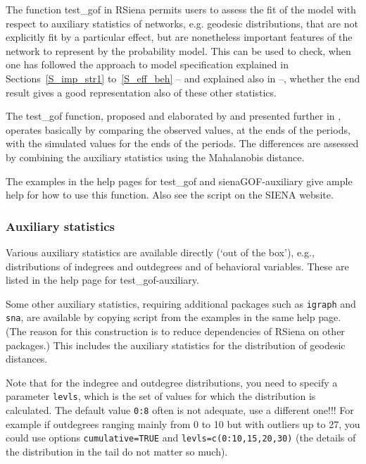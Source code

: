 \documentclass[a4paper,fleqn,11pt]{article}
\newcommand{\+}{\, + \,}
\newcommand{\sfn}[1]{\textsf{#1}}
\newcommand{\RS}{{\sf \textsf{RSiena} }}
\newcommand{\SI}{{\sf SIENA }}
\begin{document}
The function  \sfn{test\_gof} in \RS permits users
to assess the fit of the model with respect to
auxiliary statistics of networks, e.g. geodesic distributions,
that are not explicitly fit by a particular effect,
but are nonetheless important features of the network to represent by the
probability model.
This can be used to check, when one has followed the approach to
model specification explained in Sections~\ref{S_imp_str1}
to~\ref{S_eff_beh} -- and explained also in \citet{SnijdersEA10b} --,
whether the end result gives a good representation
also of these other statistics.

The \textsf{test\_gof} function, proposed and elaborated by
\citet{Lospinoso2012} and presented further
in \citet{LospinosoSnijders2019}, operates basically by comparing
the observed values, at the ends of the periods, with the
simulated values for the ends of the periods.
The differences are assessed by combining the auxiliary statistics
using the Mahalanobis distance.

The examples in the help pages for \textsf{test\_gof} and \sfn{sienaGOF-auxiliary}
give ample help for how to use this function.
Also see the script on the \SI website.


\subsubsection{Auxiliary statistics}

Various auxiliary statistics are available directly (`out of the box'),
e.g., distributions of indegrees and outdegrees and of behavioral
variables. These are listed in the help page for
 \sfn{test\_gof-auxiliary}.

Some other auxiliary statistics, requiring
additional packages such as \texttt{igraph} and \texttt{sna},
are available by copying script from the examples in the same help page.
(The reason for this construction is to reduce dependencies
of \RS on other packages.) This includes the auxiliary statistics
for the distribution of geodesic distances.

Note that for the indegree and outdegree distributions, you need
to specify a parameter \texttt{levls}, which is the set of values
for which the distribution is calculated.
The default value \texttt{0:8} often is not adequate, use a different one!!!
For example if outdegrees ranging mainly from 0 to 10 but with outliers up to 27,
you could use options \texttt{cumulative=TRUE} and \texttt{levls=c(0:10,15,20,30)}
(the details of the distribution in the tail do not matter so much).
\end{document}
